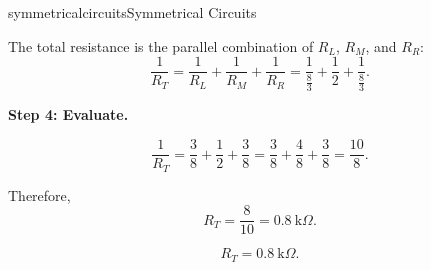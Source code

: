 \begin{mainquestion}{symmetricalcircuits}{Symmetrical Circuits}
\begin{answer}
The total resistance is the parallel combination of $R_L$, $R_M$, and $R_R$:
\[
\frac{1}{R_T}
= \frac{1}{R_L} + \frac{1}{R_M} + \frac{1}{R_R}
= \frac{1}{\frac{8}{3}} + \frac{1}{2} + \frac{1}{\frac{8}{3}}.
\]

\medskip
\noindent
\textbf{Step 4: Evaluate.}

\[
\frac{1}{R_T}
= \frac{3}{8} + \frac{1}{2} + \frac{3}{8}
= \frac{3}{8} + \frac{4}{8} + \frac{3}{8}
= \frac{10}{8}.
\]

Therefore,
\[
R_T = \frac{8}{10} = 0.8~\text{k}\Omega.
\]

\[
\boxed{R_T = 0.8~\text{k}\Omega.}
\]
\end{answer}

\end{mainquestion}
